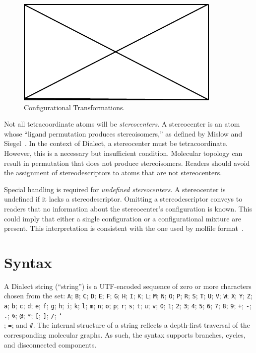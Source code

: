 \documentclass{article}
\def\ttt{\texttt}
\begin{document}
\begin{figure}
    \centering
    \includegraphics{filler}
    \caption{Configurational Transformations.}
    \label{fig:iconfigurational-transformations}
\end{figure}

Not all tetracoordinate atoms will be \textit{stereocenters}. A stereocenter is an atom whose \enquote{ligand permutation produces stereoisomers,} as defined by Mislow and Siegel~\cite{mislow:1984}. In the context of Dialect, a stereocenter must be tetracoordinate. However, this is a necessary but insufficient condition. Molecular topology can result in permutation that does not produce stereoisomers. Readers should avoid the assignment of stereodescriptors to atoms that are not stereocenters.

Special handling is required for \textit{undefined stereocenters}. A stereocenter is undefined if it lacks a stereodescriptor. Omitting a stereodescriptor conveys to readers that no information about the stereocenter's configuration is known. This could imply that either a single configuration or a configurational mixture are present. This interpretation is consistent with the one used by molfile format~\cite{ctfileFormats}.

\section*{Syntax}

A Dialect string (\enquote{string}) is a UTF-encoded sequence of zero or more characters chosen from the set: \ttt{A}; \ttt{B}; \ttt{C}; \ttt{D}; \ttt{E}; \ttt{F}; \ttt{G}; \ttt{H}; \ttt{I}; \ttt{K}; \ttt{L}; \ttt{M}; \ttt{N}; \ttt{O}; \ttt{P}; \ttt{R}; \ttt{S}; \ttt{T}; \ttt{U}; \ttt{V}; \ttt{W}; \ttt{X}; \ttt{Y}; \ttt{Z}; \ttt{a}; \ttt{b}; \ttt{c}; \ttt{d}; \ttt{e}; \ttt{f}; \ttt{g}; \ttt{h}; \ttt{i}; \ttt{k}; \ttt{l}; \ttt{m}; \ttt{n}; \ttt{o}; \ttt{p}; \ttt{r}; \ttt{s}; \ttt{t}; \ttt{u}; \ttt{v}; \ttt{0}; \ttt{1}; \ttt{2}; \ttt{3}; \ttt{4}; \ttt{5}; \ttt{6}; \ttt{7}; \ttt{8}; \ttt{9}; \ttt{+}; \ttt{-}; \ttt{.}; \ttt{\%}; \ttt{@}; \ttt{*}; \ttt{[}; \ttt{]}; \ttt{/}; \ttt{\char`\\}; \ttt{=}; and \ttt{\#}. The internal structure of a string reflects a depth-first traversal of the corresponding molecular graphs. As such, the syntax supports branches, cycles, and disconnected components.
\end{document}
